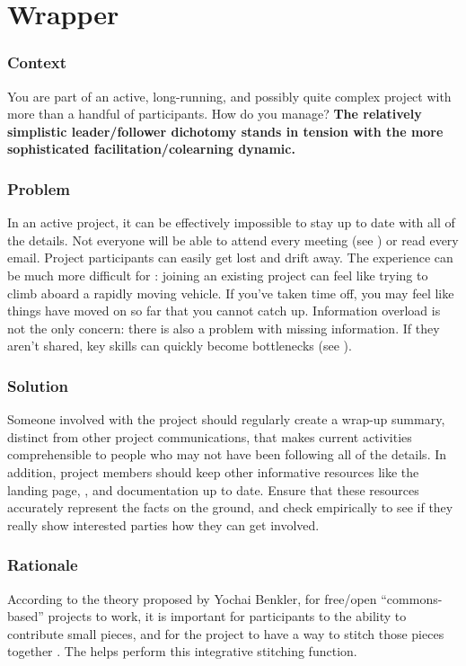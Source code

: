 
\section{Wrapper}\label{sec:Wrapper}

\subsubsection*{Context} You are part of an active, long-running, and possibly quite complex project with more than a handful of participants.  How do you manage?
\textbf{The relatively simplistic leader/follower dichotomy stands in tension with the more sophisticated facilitation/colearning dynamic.}

\subsubsection*{Problem} In an active project, it can be effectively impossible to stay up to date with all of the details.  Not everyone will be able to attend every meeting (see ) or read every email.  Project participants can easily get lost and drift away.  The experience can be much more difficult for : joining an existing project can feel like trying to climb aboard a rapidly moving vehicle.  If you've taken time off, you may feel like things have moved on so far that you cannot catch up.  Information overload is not the only concern: there is also a problem with missing information.  If they aren't shared, key skills can quickly become bottlenecks (see ).

\subsubsection*{Solution}
Someone involved with the project should regularly create a wrap-up summary, distinct from other project communications, that makes current activities comprehensible to people who may not have been following all of the details.  In addition, project members should keep other informative resources like the landing page, , and documentation up to date.  Ensure that these resources accurately represent the facts on the ground, and check empirically to see if they really show interested parties how they can get involved.

\subsubsection*{Rationale}
According to the theory proposed by Yochai Benkler, for free/open ``commons-based'' projects to work, it is important for participants to the ability to contribute small pieces, and for the project to have a way to stitch those pieces together \cite{coases-penguin}.  The  helps perform this integrative stitching function.

